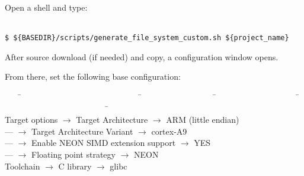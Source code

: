 \documentclass[openany,a4paper]{book}
\begin{document}
Open a shell and type:

\begin{tabbing}
\kill \hspace{1cm} \= \\
\> \texttt{\$ \$\{BASEDIR\}/scripts/generate\_file\_system\_custom.sh \$\{project\_name\}}\\
\end{tabbing}

After source download (if needed) and copy, a configuration window opens.

From there, set the following base configuration:

\begin{tabbing}
\kill \ \ \ \= \ \ \ \ \ \ \ \ \ \ \ \ \ \ \ \ \ \ \ \ \ \ \ \ \ \ \ \ \ \= \ \ \ \ \ \ \ \ \ \ \ \ \ \ \ \ \ \ \= \ \ \ \ \ \ \ \ \ \ \ \ \ \ \ \ \ \ \ \ \= \ \ \ \ \ \ \ \ \ \ \ \ \ \ \ \ \ \ \ \ \ \ \ \ \ \ \= \ \ \ \ \ \ \ \ \ \ \ \ \ \ \ \ \ \ \ \ \ \ \ \= \\
\> Target options                     \> $\rightarrow$ Target Architecture                           \>                                                          \>\> $\rightarrow$ ARM (little endian) \\
\> ---                                \> $\rightarrow$ Target Architecture Variant                   \>                                                          \>\> $\rightarrow$ cortex-A9 \\
\> ---                                \> $\rightarrow$ Enable NEON SIMD extension support            \>                                                          \>\> $\rightarrow$ YES \\
\> ---                                \> $\rightarrow$ Floating point strategy                       \>                                                          \>\> $\rightarrow$ NEON \\
\> Toolchain                          \> $\rightarrow$ C library                                     \>                                                          \>\> $\rightarrow$ glibc \\

\end{tabbing}
\end{document}
